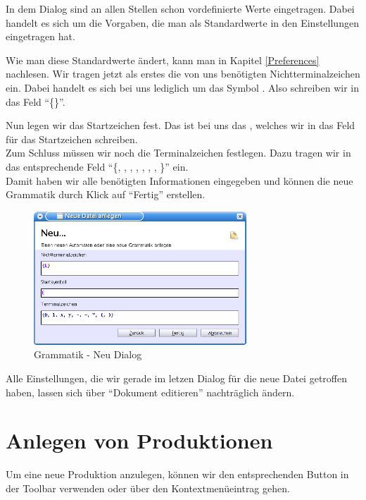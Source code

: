In dem Dialog sind an allen Stellen schon vordefinierte Werte eingetragen.
Dabei handelt es sich um die Vorgaben, die man als Standardwerte in den
Einstellungen eingetragen hat.

Wie man diese Standardwerte ändert, kann man in Kapitel \ref{Preferences}
nachlesen. Wir tragen jetzt als erstes die von uns benötigten
Nichtterminalzeichen ein. Dabei handelt es sich bei uns lediglich um das Symbol
. Also schreiben wir in das Feld
"`\{\}"'.\vspace{10pt}

Nun legen wir das Startzeichen fest. Das ist bei uns das ,
welches wir in das Feld für das Startzeichen schreiben.\\
Zum Schluss müssen wir noch die Terminalzeichen festlegen. Dazu tragen
wir in das entsprechende Feld "`\{, ,
, , \TerminalSymbol{+},
\TerminalSymbol{*}, \TerminalSymbol{(}, \TerminalSymbol{)}\}"' ein.\\ Damit
haben wir alle benötigten Informationen eingegeben und können die neue Grammatik
durch Klick auf "`Fertig"' erstellen.\vspace{10pt}

\begin{figure}[h]
\begin{center}
\includegraphics[width=8cm]{../images/new_dialog_grammar.png}
\caption{Grammatik - Neu Dialog}
\end{center}
\end{figure}

Alle Einstellungen, die wir gerade im letzen Dialog für die neue Datei getroffen
haben, lassen sich über "`Dokument editieren"' nachträglich ändern.

\section{Anlegen von Produktionen}

Um eine neue Produktion anzulegen, können wir den entsprechenden Button in der
Toolbar verwenden oder über den Kontextmenüeintrag gehen.\vspace{10pt}

